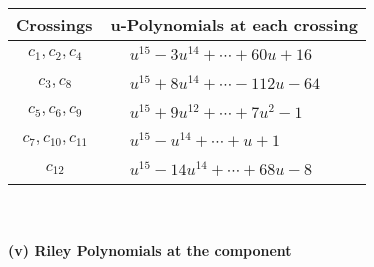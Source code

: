 \documentclass[1p]{elsarticle_modified}
\theoremstyle{definition}
\begin{document}
\begin{tabular}{m{50pt}|m{274pt}}
Crossings & \hspace{64pt}u-Polynomials at each crossing \\
\hline $$\begin{aligned}c_{1},c_{2},c_{4}\end{aligned}$$&$\begin{aligned}
&u^{15}-3 u^{14}+\cdots+60 u+16
\end{aligned}$\\
\hline $$\begin{aligned}c_{3},c_{8}\end{aligned}$$&$\begin{aligned}
&u^{15}+8 u^{14}+\cdots-112 u-64
\end{aligned}$\\
\hline $$\begin{aligned}c_{5},c_{6},c_{9}\end{aligned}$$&$\begin{aligned}
&u^{15}+9 u^{12}+\cdots+7 u^2-1
\end{aligned}$\\
\hline $$\begin{aligned}c_{7},c_{10},c_{11}\end{aligned}$$&$\begin{aligned}
&u^{15}- u^{14}+\cdots+u+1
\end{aligned}$\\
\hline $$\begin{aligned}c_{12}\end{aligned}$$&$\begin{aligned}
&u^{15}-14 u^{14}+\cdots+68 u-8
\end{aligned}$\\
\hline
\end{tabular}\\~\\
\newpage\renewcommand{\arraystretch}{1}
\flushleft \textbf{(v) Riley Polynomials at the component}\newline \\
\end{document}
